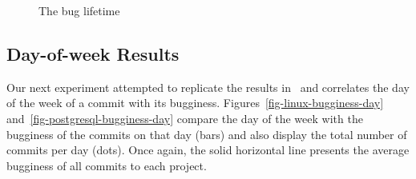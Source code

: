 \begin{figure}[tbh]
\centering
{}
\caption{The bug lifetime}
\label{fig-bug-lifetime} %
\end{figure}


\subsection{Day-of-week Results}
Our next experiment attempted to replicate the results
in~\cite{sliwerski-msr-2005} and correlates the day of the week
of a commit with its bugginess. Figures~\ref{fig-linux-bugginess-day} 
and~\ref{fig-postgresql-bugginess-day} compare the day of the week
with the bugginess of the commits on that day (bars) and also display
the total number of commits per day (dots). Once again, the solid
horizontal line presents the average bugginess of all commits to
each project.

